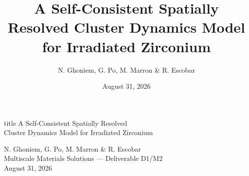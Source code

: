 \documentclass[aspectratio=169,10pt]{beamer}
\title{A Self-Consistent Spatially Resolved Cluster Dynamics Model\\for Irradiated Zirconium}
\author{N. Ghoniem, G. Po, M. Marron \& R. Escobar}
\date{August 31, 2026}
\begin{document}
{
\begin{frame}[plain]
  \vfill
  \begin{beamercolorbox}[wd=\paperwidth,center]{title}
    \vspace{2.2ex}
    {A Self-Consistent Spatially Resolved\\[4pt]
     Cluster Dynamics Model for Irradiated Zirconium}
    \vspace{2.2ex}
  \end{beamercolorbox}
  \vspace{5ex}
  \begin{center}
    {\large N. Ghoniem, G. Po, M. Marron \& R. Escobar}\\[3ex]
    {\footnotesize Multiscale Materials Solutions --- Deliverable D1/M2}\\[3ex]
    {\normalsize August 31, 2026}
  \end{center}
  \vfill
\end{frame}}
\end{document}
